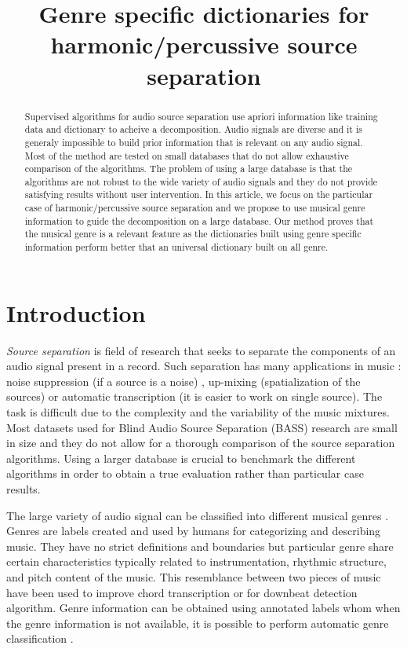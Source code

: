 \documentclass{article}
\title{Genre specific dictionaries for harmonic/percussive source separation}
\begin{document}
%
\maketitle
%
\begin{abstract}

Supervised algorithms for audio source separation use apriori information like training data and dictionary to acheive a decomposition. Audio signals are diverse and it is generaly impossible to build prior information that is relevant on any audio signal. Most of the method are tested on small databases that do not allow exhaustive comparison of the algorithms. The problem of using a large database is that the algorithms are not robust to the wide variety of audio signals and they do not provide satisfying results without user intervention. In this article, we focus on the particular case of harmonic/percussive source separation and we propose to use musical genre information to guide the decomposition on a large database. Our method proves that the musical genre is a relevant feature as the dictionaries built using genre specific information perform better that an universal dictionary built on all genre.  



\end{abstract}
%
\section{Introduction}\label{sec:introduction}


\emph{Source separation} is field of ​​research that seeks to separate the components of an audio signal present in a record. Such separation has many applications in music : noise suppression \cite{boll1979suppression} (if a source is a noise) , up-mixing \cite{fitzgerald2011upmixing}(spatialization of the sources) or automatic transcription \cite{Bertin07} (it is easier to work on single source). The task is difficult due to the complexity and the variability of the music mixtures. Most datasets used for Blind Audio Source Separation (BASS) research are small in size and they do not allow for a thorough comparison of the source separation algorithms. Using a larger database is crucial to benchmark the different algorithms in order to obtain a true evaluation rather than particular case results. 

The large variety of audio signal can be classified into different musical genres \cite{tzanetakis2002musical}. Genres are labels created and used by humans for categorizing and describing music. They have no strict definitions and boundaries but particular genre share certain characteristics typically related to instrumentation, rhythmic structure, and pitch content of the music. This resemblance between two pieces of music have been used to improve chord transcription \cite{ni2012using,lee2008acoustic} or for downbeat detection \cite{hockman2012one} algorithm. Genre information can be obtained using annotated labels whom when the genre information is not available, it is possible to perform automatic genre classification \cite{li2003comparative}.
\end{document}
